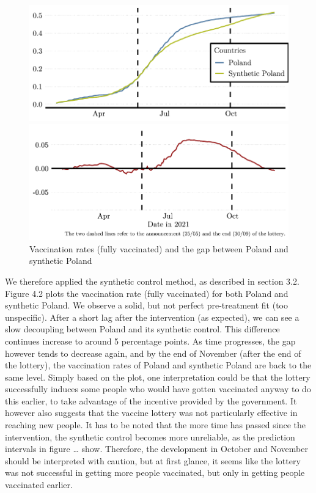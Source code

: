 \documentclass{scrbook}
\begin{document}
\begin{figure}[h]
\caption{Vaccination rates (fully vaccinated) and the gap between Poland and synthetic Poland}

\begin{center}\includegraphics{bachelor_thesis_files/figure-latex/unnamed-chunk-3-1} \end{center}



\begin{center}\includegraphics{bachelor_thesis_files/figure-latex/unnamed-chunk-3-2} \end{center}
\end{figure}

We therefore applied the synthetic control method, as described in
section 3.2. Figure 4.2 plots the vaccination rate (fully vaccinated)
for both Poland and synthetic Poland. We observe a solid, but not
perfect pre-treatment fit (too unspecific). After a short lag after the
intervention (as expected), we can see a slow decoupling between Poland
and its synthetic control. This difference continues increase to around
5 percentage points. As time progresses, the gap however tends to
decrease again, and by the end of November (after the end of the
lottery), the vaccination rates of Poland and synthetic Poland are back
to the same level. Simply based on the plot, one interpretation could be
that the lottery successfully induces some people who would have gotten
vaccinated anyway to do this earlier, to take advantage of the incentive
provided by the government. It however also suggests that the vaccine
lottery was not particularly effective in reaching new people. It has to
be noted that the more time has passed since the intervention, the
synthetic control becomes more unreliable, as the prediction intervals
in figure \ldots{} show. Therefore, the development in October and
November should be interpreted with caution, but at first glance, it
seems like the lottery was not successful in getting more people
vaccinated, but only in getting people vaccinated earlier.
\end{document}
